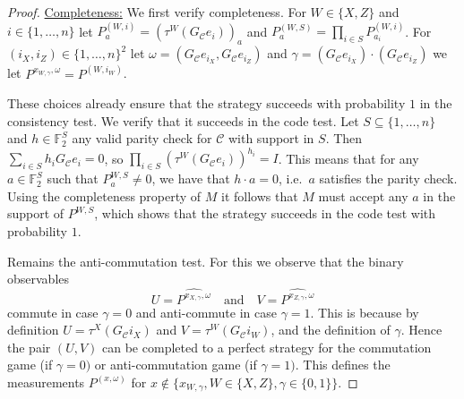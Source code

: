 \documentclass[11pt]{article}
\theoremstyle{definition}
\newcommand{\code}{\mathcal{C}}
\newcommand{\Id}{\ensuremath{I}}
\newcommand{\field}{\mathbb{F}_2}
\newcommand{\F}{\ensuremath{\mathbb{F}}}
\begin{document}
\begin{proof}
\underline{Completeness:} We first verify completeness. For $W\in\{X,Z\}$ and $i\in\{1,\ldots,n\}$ let $P^{(W,i)}_a = (\tau^W(G_\code e_i))_a$ and $P^{(W,S)}_a = \prod_{i\in S} P^{(W,i)}_{a_i}$. For $(i_X,i_Z)\in \{1,\ldots,n\}^2 $ let $\omega=(G_\code e_{i_X}, G_\code e_{i_Z})$ and $\gamma =(G_\code e_{i_X}) \cdot(G_\code e_{i_Z}) $ we let $P^{x_{W,\gamma},\omega} = P^{(W,i_W)}$. 

These choices already ensure that the strategy succeeds with probability $1$ in the consistency test. We verify that it succeeds in the code test. Let $S\subseteq\{1,\ldots,n\}$ and $h\in \F_2^S$ any valid parity check for $\code$ with support in $S$. Then $\sum_{i\in S} h_i G_\code e_i = 0$, so $\prod_{i\in S}(\tau^W(G_\code e_i))^{h_i}=\Id$. This means that for any $a\in\field^S$ such that $P^{W,S}_a\neq 0$, we have that $h\cdot a =0$, i.e.\ $a$ satisfies the parity check. Using the completeness property of $M$ it follows that $M$ must accept any $a$ in the support of $P^{W,S}$, which shows that the strategy succeeds in the code test with probability $1$. 

Remains the anti-commutation test. For this we observe that 
the binary observables 
\[ U=\widehat{ P^{x_{X,\gamma},\omega}} \quad\text{and}\quad V= \widehat{P^{x_{Z,\gamma},\omega} } \]
commute in case $\gamma=0$ and anti-commute in case $\gamma=1$. This is because by definition $U=\tau^X(G_\code i_X)$ and $V=\tau^W(G_\code i_W)$, and the definition of $\gamma$. Hence the pair $(U,V)$ can be completed to a perfect strategy for the commutation game (if $\gamma=0)$ or anti-commutation game (if $\gamma=1)$. This defines the measurements $P^{(x,\omega)}$ for $x\notin \{x_{W,\gamma},W\in\{X,Z\},\gamma\in\{0,1\}\}$. 

\bigskip 


\end{proof}
\end{document}
